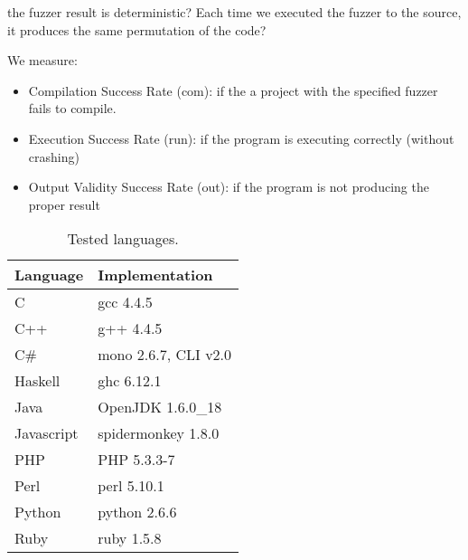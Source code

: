 \documentclass[10pt]{sigplanconf}
\begin{document}
the fuzzer result is deterministic? Each time we executed the fuzzer to the source, it produces the same permutation of the code?

We measure:

\begin{itemize}
	\item Compilation Success Rate (com): if the a project with the specified fuzzer fails to compile.
	\item Execution Success Rate (run): if the program is executing correctly (without crashing)
	\item Output Validity Success Rate (out): if the program is not producing the proper result
\end{itemize}

\begin{table}
\begin{center}
\begin{tabular}{ l l}
 \hline
Language & Implementation \\
\hline
C 			& gcc 4.4.5 \\
C++ 		& g++ 4.4.5 \\
C\# 		& mono 2.6.7, CLI v2.0 \\
Haskell 	& ghc 6.12.1 \\
Java 		& OpenJDK 1.6.0\_18 \\
Javascript 	& spidermonkey 1.8.0 \\
PHP 		& PHP 5.3.3-7 \\
Perl 		& perl 5.10.1 \\
Python 		& python 2.6.6 \\
Ruby 		& ruby 1.5.8 \\
\hline
\end{tabular}
\end{center}
\caption{Tested languages.}
\label{tab:langs}
\end{table}
\end{document}
